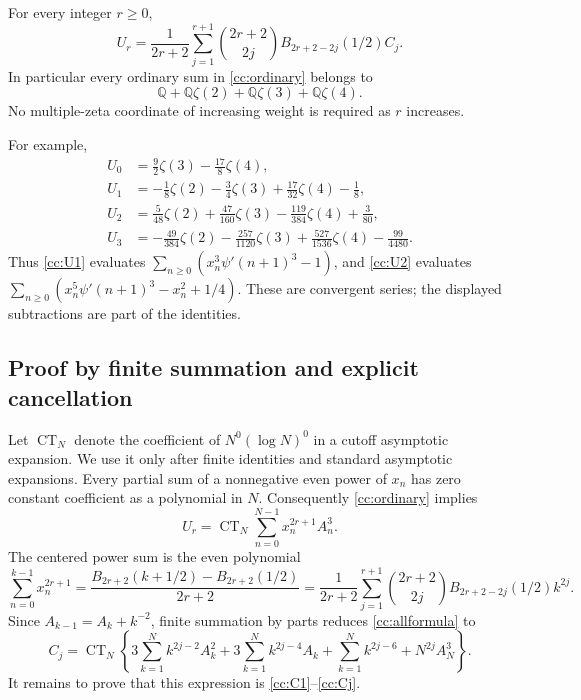 \begin{theorem}
\label{cc:all}
For every integer $r\ge0$,
\begin{equation}\label{cc:allformula}
 \boxed{\displaystyle
 U_r=\frac1{2r+2}\sum_{j=1}^{r+1}
      \binom{2r+2}{2j}B_{2r+2-2j}(1/2)C_j.}
\end{equation}
In particular every ordinary sum in \eqref{cc:ordinary} belongs to
\[
 \mathbb Q+\mathbb Q\zeta(2)+\mathbb Q\zeta(3)+\mathbb Q\zeta(4).
\]
No multiple-zeta coordinate of increasing weight is required as $r$
increases.
\end{theorem}

For example,
\begin{align}
 U_0&=\frac92\zeta(3)-\frac{17}{8}\zeta(4),
       \label{cc:U0}\\
 U_1&=-\frac18\zeta(2)-\frac34\zeta(3)
          +\frac{17}{32}\zeta(4)-\frac18,
       \label{cc:U1}\\
 U_2&=\frac5{48}\zeta(2)+\frac{47}{160}\zeta(3)
          -\frac{119}{384}\zeta(4)+\frac3{80},
       \label{cc:U2}\\
 U_3&=-\frac{49}{384}\zeta(2)-\frac{257}{1120}\zeta(3)
          +\frac{527}{1536}\zeta(4)-\frac{99}{4480}.
       \label{cc:U3}
\end{align}
Thus \eqref{cc:U1} evaluates
$\sum_{n\ge0}(x_n^3\psi'(n+1)^3-1)$, and
\eqref{cc:U2} evaluates
$\sum_{n\ge0}(x_n^5\psi'(n+1)^3-x_n^2+1/4)$.
These are convergent series; the displayed subtractions are part of
the identities.

\subsection{Proof by finite summation and explicit cancellation}

Let $\operatorname{CT}_N$ denote the coefficient of
$N^0(\log N)^0$ in a cutoff asymptotic expansion.  We use it only
after finite identities and standard asymptotic expansions.
Every partial sum of a nonnegative even power of $x_n$ has zero
constant coefficient as a polynomial in $N$.  Consequently
\eqref{cc:ordinary} implies
\begin{equation}\label{cc:cutoff}
 U_r=\operatorname{CT}_N\sum_{n=0}^{N-1}x_n^{2r+1}A_n^3.
\end{equation}
The centered power sum is the even polynomial
\begin{equation}\label{cc:centeredsum}
 \sum_{n=0}^{k-1}x_n^{2r+1}
 =\frac{B_{2r+2}(k+1/2)-B_{2r+2}(1/2)}{2r+2}
 =\frac1{2r+2}\sum_{j=1}^{r+1}
      \binom{2r+2}{2j}B_{2r+2-2j}(1/2)k^{2j}.
\end{equation}
Since $A_{k-1}=A_k+k^{-2}$, finite summation by parts reduces
\eqref{cc:allformula} to
\begin{equation}\label{cc:Ccutoff}
 C_j=\operatorname{CT}_N\left\{
 3\sum_{k=1}^Nk^{2j-2}A_k^2
 +3\sum_{k=1}^Nk^{2j-4}A_k
 +\sum_{k=1}^Nk^{2j-6}+N^{2j}A_N^3\right\}.
\end{equation}
It remains to prove that this expression is
\eqref{cc:C1}--\eqref{cc:Cj}.

